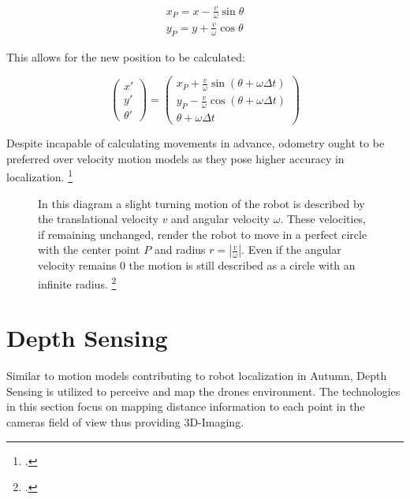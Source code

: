 \begin{equation}
	\begin{split}
		x_{P} = x - \frac{v}{\omega} \sin \theta \\
		y_{P} = y + \frac{v}{\omega} \cos \theta
	\end{split}
\end{equation}

This allows for the new position to be calculated: 

\begin{equation}
	\begin{pmatrix}
		x' \\
		y' \\
		\theta'
	\end{pmatrix}
	=
	\begin{pmatrix}
		x_{P} + \frac{v}{\omega} \sin(\theta + \omega \Delta t) \\
		y_{P} - \frac{v}{\omega} \cos(\theta + \omega \Delta t) \\
		\theta + \omega \Delta t
	\end{pmatrix}
\end{equation}

Despite incapable of calculating movements in advance, odometry ought to be preferred over velocity motion models as they pose higher accuracy in localization. \footcite[Page 107]{thrun2002probabilisticRobotics}

\begin{figure}
	\centering
	
	\caption{
		In this diagram a slight turning motion of the robot is described by the translational velocity $v$ and angular velocity $\omega$. These velocities, if remaining unchanged, render the robot to move in a perfect circle with the center point $P$ and radius $r = | \frac{v}{\omega}|$. Even if the angular velocity remains 0 the motion is still described as a circle with an infinite radius. \footcite[Pages 95 - 107]{thrun2002probabilisticRobotics}
	}
	\label{fig:inertial}
\end{figure}



\section{Depth Sensing}
Similar to motion models contributing to robot localization in Autumn, Depth Sensing is utilized to perceive and map the drones environment. 
The technologies in this section focus on mapping distance information to each point in the cameras field of view thus providing 3D-Imaging.

